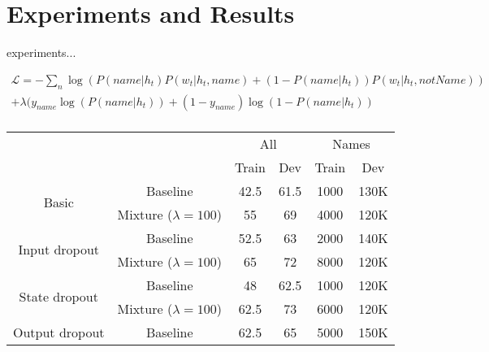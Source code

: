 \chapter{Experiments and Results}

experiments... 

\begin{equation}
\begin{split}
  \mathcal{L}=-\sum_{n} \log(P(name|h_t)P(w_t|h_t, name) + (1-P(name|h_t))P(w_t|h_t, notName)) \\
   + \lambda(y_{name}\log(P(name|h_t)) + (1 - y_{name})\log(1-P(name|h_t)) \\
\end{split}
\end{equation}

\begin{table}[]
	\centering
	\begin{tabular}{cc|c|c|c|c|}
		\cline{3-6}
		\multicolumn{1}{l}{}                                                    & \multicolumn{1}{l|}{}   & \multicolumn{2}{c|}{All} & \multicolumn{2}{c|}{Names} \\ \cline{3-6} 
		&                         & Train       & Dev        & Train        & Dev         \\ \hline
		\multicolumn{1}{|c|}{\multirow{2}{*}{Basic}}                            & Baseline                & 42.5        & 61.5       & 1000         & 130K        \\ \cline{2-6} 
		\multicolumn{1}{|c|}{}                                                  & Mixture ($\lambda=100$) & 55          & 69         & 4000         & 120K        \\ \hline
		\multicolumn{1}{|c|}{\multirow{2}{*}{Input dropout}}                    & Baseline                & 52.5        & 63         & 2000         & 140K        \\ \cline{2-6} 
		\multicolumn{1}{|c|}{}                                                  & Mixture ($\lambda=100$) & 65          & 72         & 8000         & 120K        \\ \hline
		\multicolumn{1}{|c|}{\multirow{2}{*}{State dropout}}                    & Baseline                & 48          & 62.5       & 1000         & 120K        \\ \cline{2-6} 
		\multicolumn{1}{|c|}{}                                                  & Mixture ($\lambda=100$) & 62.5        & 73         & 6000         & 120K        \\ \hline
		\multicolumn{1}{|c|}{\multirow{2}{*}{Output dropout}}                   & Baseline                & 62.5        & 65         & 5000         & 150K        \\ \cline{2-6} 

\end{tabular}
\end{table}

